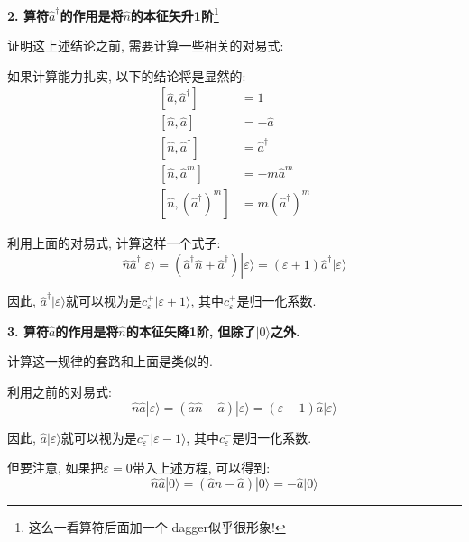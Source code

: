 \documentclass[a4paper, 11pt]{article}
\begin{document}
\begin{spacing}{1.2}
        \textbf{2. 算符$\hat{a}^{\dagger}$的作用是将$\hat{n}$的本征矢升1阶}\footnote{这么一看算符后面加一个
        dagger似乎很形象!}

        证明这上述结论之前, 需要计算一些相关的对易式:

        如果计算能力扎实, 以下的结论将是显然的:
        \begin{subequations}
          \begin{align}
            \left[\hat{a}, \hat{a}^{\dagger}\right] &= 1\\
            \left[\hat{n}, \hat{a}\right] &= -\hat{a}\\
            \left[\hat{n}, \hat{a}^{\dagger}\right] &= \hat{a}^{\dagger}\\
            \left[\hat{n}, \hat{a}^m\right] &= -m\hat{a}^m\\
            \left[\hat{n}, \left(\hat{a}^{\dagger}\right)^m\right] &= m\left(\hat{a}^{\dagger}\right)^m
          \end{align}
        \end{subequations}

        利用上面的对易式, 计算这样一个式子:
        \begin{equation}
          \hat{n}\hat{a}^{\dagger}|\varepsilon\rangle = (\hat{a}^{\dagger}\hat{n}+\hat{a}^{\dagger})|\varepsilon\rangle%
          = (\varepsilon+1)\hat{a}^{\dagger}|\varepsilon\rangle
        \end{equation}

        因此, $\hat{a}^{\dagger}|\varepsilon\rangle$就可以视为是$c_{\varepsilon}^{+}|\varepsilon+1\rangle$, 
        其中$c_{\varepsilon}^{+}$是归一化系数. 

        \textbf{3. 算符$\hat{a}$的作用是将$\hat{n}$的本征矢降1阶, 但除了$|0\rangle$之外.}

        计算这一规律的套路和上面是类似的. 

        利用之前的对易式: 
        \begin{equation}
          \hat{n}\hat{a}|\varepsilon\rangle = (\hat{a}\hat{n}-\hat{a})|\varepsilon\rangle%
          = (\varepsilon-1)\hat{a}|\varepsilon\rangle
        \end{equation}

        因此, $\hat{a}|\varepsilon\rangle$就可以视为是$c_{\varepsilon}^{-}|\varepsilon-1\rangle$, 
        其中$c_{\varepsilon}^{-}$是归一化系数.

        但要注意, 如果把$\varepsilon=0$带入上述方程, 可以得到:
        \begin{equation}
          \hat{n}\hat{a}|0\rangle = (\hat{a}\hat{n}-\hat{a})|0\rangle%
          = -\hat{a}|0\rangle
        \end{equation}


\end{spacing}
\end{document}
